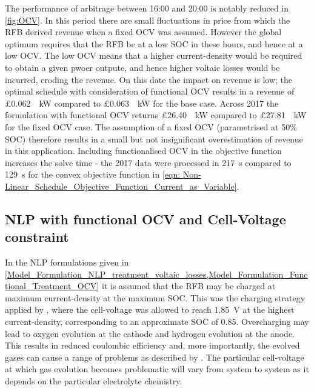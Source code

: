 \documentclass[preprint,3p,review,authoryear,10pt]{elsarticle}
\begin{document}
The performance of arbitrage between 16:00 and 20:00 is notably reduced in \cref{fig:OCV}. In this period there are small fluctuations in price from which the RFB derived revenue when a fixed OCV was assumed. However the global optimum requires that the RFB be at a low SOC in these hours, and hence at a low OCV. The low OCV means that a higher current-density would be required to obtain a given pwoer outpute, and hence higher voltaic losses would be incurred, eroding the revenue. On this date the impact on revenue is low; the optimal schedule with consideration of functional OCV results in a revenue of \pounds \SI{0.062}{\per\kilo\watt} compared to \pounds \SI{0.063}{\per\kilo\watt} for the base case. Across 2017 the formulation with functional OCV returns \pounds \SI{26.40}{\per\kilo\watt} compared to \pounds \SI{27.81}{\per\kilo\watt} for the fixed OCV case. The assumption of a fixed OCV (parametrised at 50\% SOC) therefore results in a small but not insignificant overestimation of revenue in this application. Including functionalised OCV in the objective function increases the solve time - the 2017 data were processed in \SI{217}{\second} compared to \SI{129}{\second} for the convex objective function in \cref{eqn: Non-Linear_Schedule_Objective_Function_Current_as_Variable}. 


\subsection{NLP with functional OCV and Cell-Voltage constraint}
\label{Results_Cell_Voltage_Constraint}
In the NLP formulations given in \cref{Model_Formulation_NLP_treatment_voltaic_losses,Model_Formulation_Functional_Treatment_OCV} it is assumed that the RFB may be charged at maximum current-density at the maximum SOC. This was the charging strategy applied by \cite{Reed2016}, where the cell-voltage was allowed to reach \SI{1.85}{\volt} at the highest current-density, corresponding to an approximate SOC of 0.85. Overcharging may lead to oxygen evolution at the cathode and hydrogen evolution at the anode. This results in reduced coulombic efficiency and, more importantly, the evolved gases can cause a range of problems as described by \cite{Kear2012}.  The particular cell-voltage at which gas evolution becomes problematic will vary from system to system as it depends on the particular electrolyte chemistry. 
\end{document}
